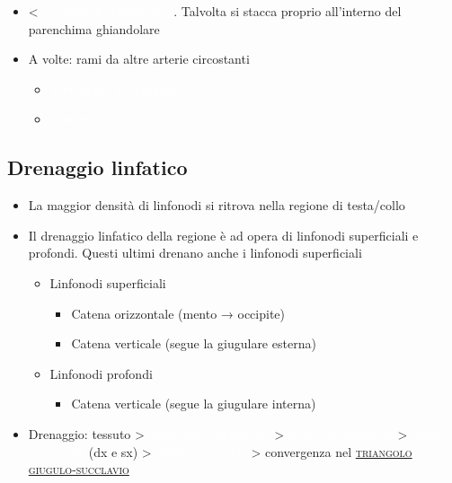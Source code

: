 \documentclass[italian,]{article}
\providecommand{\tightlist}{%
  \setlength{\itemsep}{0pt}\setlength{\parskip}{0pt}}
\newcommand{\art}[1]{\colorbox{RedOrange}{\textcolor{white}{\textsc{#1}}}}
\newcommand{\lin}[1]{\colorbox{PineGreen}{\textcolor{white}{\textsc{#1}}}}
\renewcommand{\a}[1]{\underline{\textsc{#1}}}
\begin{document}
\begin{itemize}
  \begin{itemize}
  \tightlist
  \item
    \textless{} \art{temporale superficiale}. Talvolta si stacca proprio
    all'interno del parenchima ghiandolare
  \item
    A volte: rami da altre arterie circostanti

    \begin{itemize}
    \tightlist
    \item
      \art{auricolare posteriore}~
    \item
      \art{carotide esterna}~
    \end{itemize}
  \end{itemize}
\end{itemize}

\hypertarget{drenaggio-linfatico}{%
\subsection{Drenaggio linfatico}\label{drenaggio-linfatico}}

\begin{itemize}
\tightlist
\item
  La maggior densità di linfonodi si ritrova nella regione di
  testa/collo
\item
  Il drenaggio linfatico della regione è ad opera di linfonodi
  superficiali e profondi. Questi ultimi drenano anche i linfonodi
  superficiali

  \begin{itemize}
  \tightlist
  \item
    Linfonodi superficiali

    \begin{itemize}
    \tightlist
    \item
      Catena orizzontale (mento → occipite)
    \item
      Catena verticale (segue la giugulare esterna)
    \end{itemize}
  \item
    Linfonodi profondi

    \begin{itemize}
    \tightlist
    \item
      Catena verticale (segue la giugulare interna)
    \end{itemize}
  \end{itemize}
\item
  Drenaggio: tessuto \textgreater{} \lin{linfonodi superficiali}
  \textgreater{} \lin{linfonodi profondi} \textgreater{}
  \lin{dotto giugulare} (dx e sx) \textgreater{} \lin{dotto succlavio}
  \textgreater{} convergenza nel \a{triangolo giugulo-succlavio}
\end{itemize}
\end{document}
